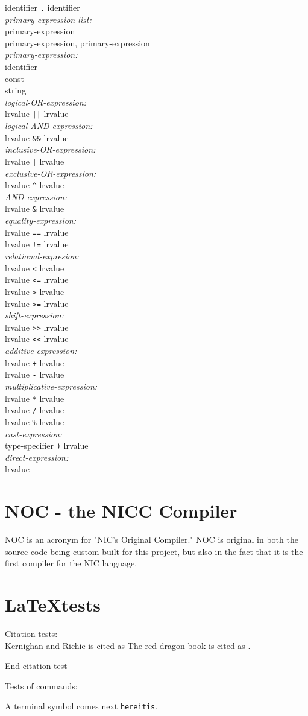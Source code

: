 \documentclass{article}
\newcommand{\nonterm}[1]{{\textit{#1:}\\ }}
\newcommand{\production}[1]{{\hspace*{1cm}#1\\ }}
\newcommand{\terminal}[1]{{\texttt{#1}}}
\begin{document}
\production{identifier \terminal{.} identifier}
\nonterm{primary-expression-list}
\production{primary-expression}
\production{primary-expression, primary-expression}
\nonterm{primary-expression}
\production{identifier}
\production{const}
\production{string}
\nonterm{logical-OR-expression}
\production{lrvalue \terminal{||} lrvalue}
\nonterm{logical-AND-expression}
\production{lrvalue \terminal{\&\&} lrvalue}
\nonterm{inclusive-OR-expression}
\production{lrvalue \terminal{|} lrvalue}
\nonterm{exclusive-OR-expression}
\production{lrvalue \terminal{\^} lrvalue}
\nonterm{AND-expression}
\production{lrvalue \terminal{\&} lrvalue}
\nonterm{equality-expression}
\production{lrvalue \terminal{==} lrvalue}
\production{lrvalue \terminal{!=} lrvalue}
\nonterm{relational-expresion}
\production{lrvalue \terminal{<} lrvalue}
\production{lrvalue \terminal{<=} lrvalue}
\production{lrvalue \terminal{>} lrvalue}
\production{lrvalue \terminal{>=} lrvalue}
\nonterm{shift-expression}
\production{lrvalue \terminal{>>} lrvalue}
\production{lrvalue \terminal{<<} lrvalue}
\nonterm{additive-expression}
\production{lrvalue \terminal{+} lrvalue}
\production{lrvalue \terminal{-} lrvalue}
\nonterm{multiplicative-expression}
\production{lrvalue \terminal{*} lrvalue}
\production{lrvalue \terminal{/} lrvalue}
\production{lrvalue \terminal{\%} lrvalue}
\nonterm{cast-expression}
\production{\terminal{(} type-specifier \terminal{)} lrvalue}
\nonterm{direct-expression}
\production{lrvalue}


\section{NOC - the NICC Compiler}
NOC is an acronym for "NIC's Original Compiler."
NOC is original in both the source code being custom built for this project, but also in the fact that it is the first compiler for the NIC language.

\section{\LaTeX tests}
Citation tests:\\
Kernighan and Richie is cited as \cite{cpl} 
The red dragon book is cited as \cite{reddragon}.

End citation test

Tests of commands:

A terminal symbol comes next \terminal{hereitis}.  



\end{document}
